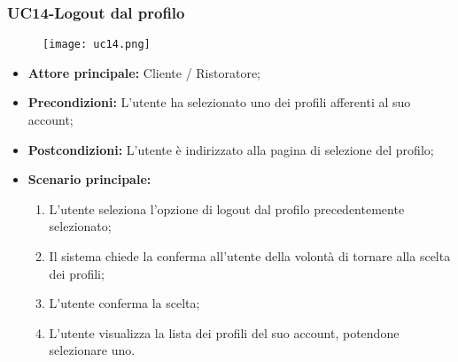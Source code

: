 \subsubsection{UC14-Logout dal profilo}
\begin{figure}[h] \texttt{[image: uc14.png]} \end{figure}
\begin{itemize}
\item \textbf{Attore principale:} Cliente / Ristoratore;
\item \textbf{Precondizioni:} L'utente ha selezionato uno dei profili afferenti al suo account;
\item \textbf{Postcondizioni:} L'utente è indirizzato alla pagina di selezione del profilo;
\item \textbf{Scenario principale:}
\begin{enumerate}
    \item L'utente seleziona l'opzione di logout dal profilo precedentemente selezionato;
    \item Il sistema chiede la conferma all'utente della volontà di tornare alla scelta dei profili;
    \item L'utente conferma la scelta;
    \item L'utente visualizza la lista dei profili del suo account, potendone selezionare uno.
\end{enumerate}
\end{itemize}
